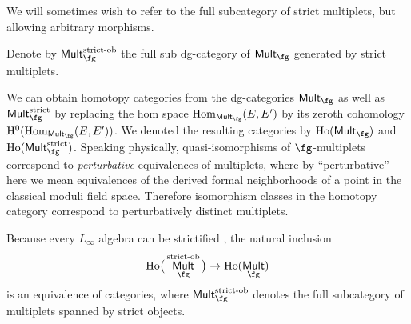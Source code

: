 \documentclass[10pt,a4paper]{amsart}
\numberwithin{equation}{section}
\def\cat#1{\ensuremath{\mathsf{#1}}}
\DeclareMathOperator{\Mult}{\cat{Mult}}
\DeclareMathOperator{\Hom}{Hom}
\begin{document}
We will sometimes wish to refer to the full subcategory of strict multiplets, but allowing arbitrary morphisms.
\begin{dfn}
	Denote by $\Mult_{\fg}^{\text{\rm strict-ob}}$ the full sub dg-category of $\Mult_{\fg}$ generated by strict multiplets.
\end{dfn}


We can obtain homotopy categories from the dg-categories $\Mult_{\fg}$ as well as $\Mult_{\fg}^{\mathrm{strict}}$ by replacing the hom space $\Hom_{\Mult_{\fg}}(E, E')$ by its zeroth cohomology $\mathrm H^0(\mathrm{Hom}_{\Mult_{\fg}}(E, E'))$. We denoted the resulting categories by $\mathrm{Ho}(\Mult_{\fg})$ and $\mathrm{Ho}(\Mult_{\fg}^{\mathrm{strict}})$. Speaking physically, quasi-isomorphisms of $\fg$-multiplets correspond to \emph{perturbative} equivalences of multiplets, where by ``perturbative'' here we mean equivalences of the derived formal neighborhoods of a point in the classical moduli field space. Therefore isomorphism classes in the homotopy category correspond to perturbatively distinct multiplets.


\begin{rmk}
	Because every $L_\infty$ algebra can be strictified \cite[Part II, Corollary 1.6]{KrizMay}, the natural inclusion
	\begin{equation*}
	\mathrm{Ho}\big(\Mult_{\fg}^{\text{\rm strict-ob}}\big) \to \mathrm{Ho}(\Mult_{\fg})
	\end{equation*}
	is an equivalence of categories, where $\Mult_{\fg}^{\text{\rm strict-ob}}$ denotes the full subcategory of multiplets spanned by strict objects.
\end{rmk}
\end{document}
